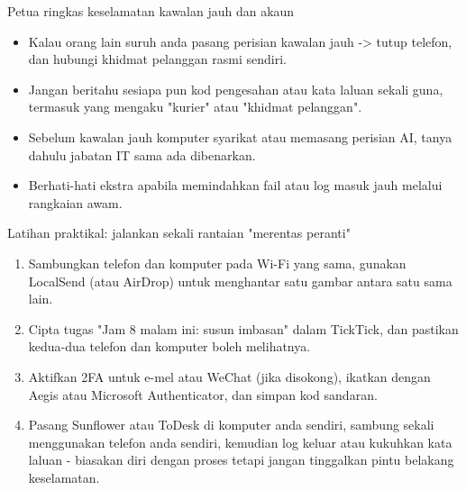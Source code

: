 \begin{tcbwarn}{Petua ringkas keselamatan kawalan jauh dan akaun}
\begin{itemize}
  \item Kalau orang lain suruh anda pasang perisian kawalan jauh -> tutup telefon, dan hubungi khidmat pelanggan rasmi sendiri.
  \item Jangan beritahu sesiapa pun kod pengesahan atau kata laluan sekali guna, termasuk yang mengaku "kurier" atau "khidmat pelanggan".
  \item Sebelum kawalan jauh komputer syarikat atau memasang perisian AI, tanya dahulu jabatan IT sama ada dibenarkan.
  \item Berhati-hati ekstra apabila memindahkan fail atau log masuk jauh melalui rangkaian awam.
\end{itemize}

\end{tcbwarn}

\begin{tcbpractice}{Latihan praktikal: jalankan sekali rantaian "merentas peranti"}
\begin{enumerate}
  \item Sambungkan telefon dan komputer pada Wi-Fi yang sama, gunakan LocalSend (atau AirDrop) untuk menghantar satu gambar antara satu sama lain.
  \item Cipta tugas "Jam 8 malam ini: susun imbasan" dalam TickTick, dan pastikan kedua-dua telefon dan komputer boleh melihatnya.
  \item Aktifkan 2FA untuk e-mel atau WeChat (jika disokong), ikatkan dengan Aegis atau Microsoft Authenticator, dan simpan kod sandaran.
  \item Pasang Sunflower atau ToDesk di komputer anda sendiri, sambung sekali menggunakan telefon anda sendiri, kemudian log keluar atau kukuhkan kata laluan - biasakan diri dengan proses tetapi jangan tinggalkan pintu belakang keselamatan.
\end{enumerate}

\end{tcbpractice}
